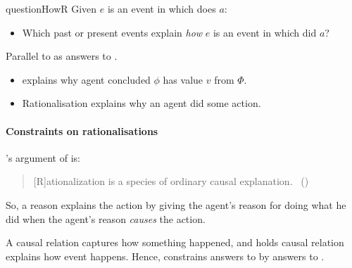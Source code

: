 \begin{note}
\begin{question}{questionHowR}{\qHowR{}}
    Given \(e\) is an event in which \vAgent{} does \(a\):

    \begin{itemize}
    \item
      Which past or present events explain \emph{how} \(e\) is an event in which \vAgent{} did \(a\)?
    \end{itemize}
    \vspace{-1.5\baselineskip}
  \end{question}

  \noindent%
  Parallel to \ros{} as answers to \qWhy{}.

  \begin{itemize}
  \item
    \ros{} explains why agent concluded \(\phi\) has value \(v\) from \(\Phi\).
  \item
    Rationalisation explains why an agent did some action.
  \end{itemize}
\end{note}

\paragraph*{Constraints on rationalisations}

\begin{note}
  \citeauthor{Davidson:1963aa}'s argument of  is:
  \begin{quote}
    [R]ationalization is a species of ordinary causal explanation.%
    \mbox{ }\hfill\mbox{(\citeyear[685]{Davidson:1963aa})}
  \end{quote}
  So, a reason explains the action by giving the agent's reason for doing what he did when the agent's reason \emph{causes} the action.

  A causal relation captures how something happened, and \citeauthor{Davidson:1963aa} holds causal relation explains how event happens.
  Hence, \citeauthor{Davidson:1963aa} constrains answers to \qWhyR{} by answers to \qHowR{}.
\end{note}

